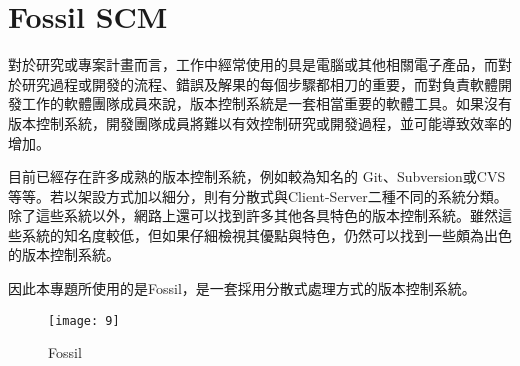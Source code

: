 \renewcommand{\baselinestretch}{20} %
\section{Fossil SCM}
\par
\renewcommand{\baselinestretch}{1} %
\twelve \qquad 對於研究或專案計畫而言，工作中經常使用的具是電腦或其他相關電子產品，而對於研究過程或開發的流程、錯誤及解果的每個步驟都相刀的重要，而對負責軟體開發工作的軟體團隊成員來說，版本控制系統是一套相當重要的軟體工具。如果沒有版本控制系統，開發團隊成員將難以有效控制研究或開發過程，並可能導致效率的增加。
\\
\par
\renewcommand{\baselinestretch}{1} %
\twelve \hspace{0.5em} 目前已經存在許多成熟的版本控制系統，例如較為知名的 Git、Subversion或CVS等等。若以架設方式加以細分，則有分散式與Client-Server二種不同的系統分類。除了這些系統以外，網路上還可以找到許多其他各具特色的版本控制系統。雖然這些系統的知名度較低，但如果仔細檢視其優點與特色，仍然可以找到一些頗為出色的版本控制系統。
\\
\par
\renewcommand{\baselinestretch}{1} %
\twelve \hspace{0.5em} 因此本專題所使用的是Fossil，是一套採用分散式處理方式的版本控制系統。
\\
\par
\renewcommand{\baselinestretch}{1.7} %
\begin{figure}[hbt!]
\begin{center}
\texttt{[image: 9]}
\caption{\large Fossil}\label{fig.Fossil}
\end{center}
\end{figure}
\par

\renewcommand{\baselinestretch}{20} %
